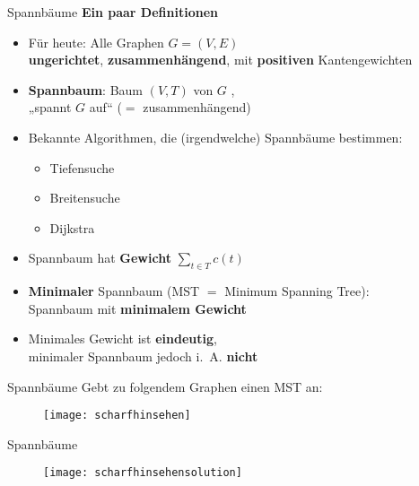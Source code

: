 \begin{frame}{Spannbäume}
	\textbf{Ein paar Definitionen} 
	\begin{itemize}
		\item Für heute: Alle Graphen $G = (V, E)$ \\ 
		\textbf{ungerichtet}, \textbf{zusammenhängend}, mit \textbf{positiven} Kantengewichten
		\pause
		\item \textbf{Spannbaum}: Baum $(V, T)$ von $G$ , \\
		„spannt $G$ auf“ ($=$ zusammenhängend)
		\pause
		\item Bekannte Algorithmen, die (irgendwelche) Spannbäume bestimmen:
		\begin{itemize}
			\item Tiefensuche
			\item Breitensuche
			\item Dijkstra
		\end{itemize}
		\pause
		\item Spannbaum hat \textbf{Gewicht} $ \sum\limits_{t \in T} c(t)$
		\pause
		\item \textbf{Minimaler} Spannbaum (MST $=$ Minimum Spanning Tree): \\ Spannbaum mit \textbf{minimalem Gewicht}
		\pause
		\item Minimales Gewicht ist \textbf{eindeutig}, \\
		minimaler Spannbaum jedoch i.~A. \textbf{nicht}
	\end{itemize}
\end{frame}


\begin{frame}[t]{Spannbäume}
	Gebt zu folgendem Graphen einen MST an: \\
	\begin{figure}[htp]
		\centering
		\texttt{[image: scharfhinsehen]}
	\end{figure}
\end{frame}

\begin{frame}[t]{Spannbäume}
	\solutionheading
	\medskip
	\begin{figure}[htp]
		\centering
		\texttt{[image: scharfhinsehensolution]}
	\end{figure}
\end{frame}

